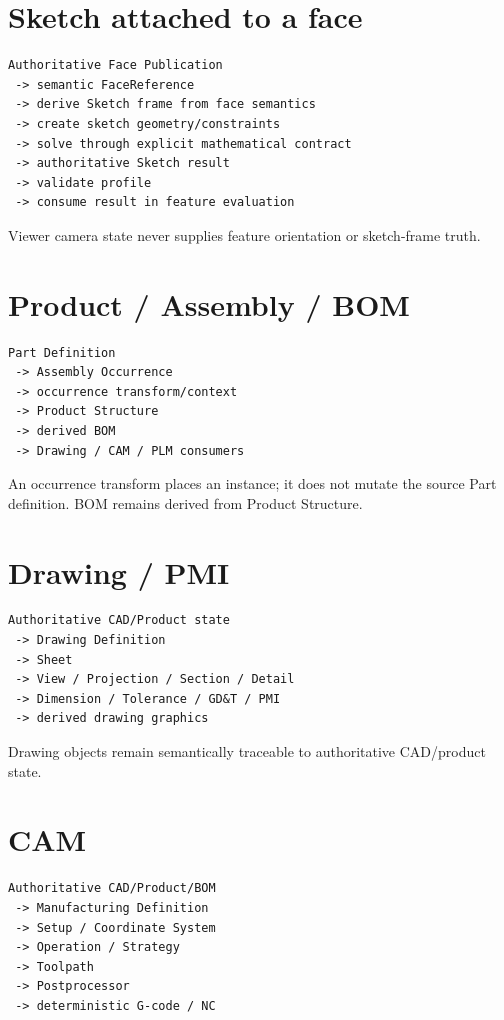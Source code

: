 \documentclass[11pt,a4paper]{report}
\begin{document}
\section{Sketch attached to a face}

\begin{lstlisting}
Authoritative Face Publication
 -> semantic FaceReference
 -> derive Sketch frame from face semantics
 -> create sketch geometry/constraints
 -> solve through explicit mathematical contract
 -> authoritative Sketch result
 -> validate profile
 -> consume result in feature evaluation
\end{lstlisting}

Viewer camera state never supplies feature orientation or sketch-frame truth.

\section{Product / Assembly / BOM}

\begin{lstlisting}
Part Definition
 -> Assembly Occurrence
 -> occurrence transform/context
 -> Product Structure
 -> derived BOM
 -> Drawing / CAM / PLM consumers
\end{lstlisting}

An occurrence transform places an instance; it does not mutate the source Part definition. BOM remains derived from Product Structure.

\section{Drawing / PMI}

\begin{lstlisting}
Authoritative CAD/Product state
 -> Drawing Definition
 -> Sheet
 -> View / Projection / Section / Detail
 -> Dimension / Tolerance / GD&T / PMI
 -> derived drawing graphics
\end{lstlisting}

Drawing objects remain semantically traceable to authoritative CAD/product state.

\section{CAM}

\begin{lstlisting}
Authoritative CAD/Product/BOM
 -> Manufacturing Definition
 -> Setup / Coordinate System
 -> Operation / Strategy
 -> Toolpath
 -> Postprocessor
 -> deterministic G-code / NC
\end{lstlisting}
\end{document}
